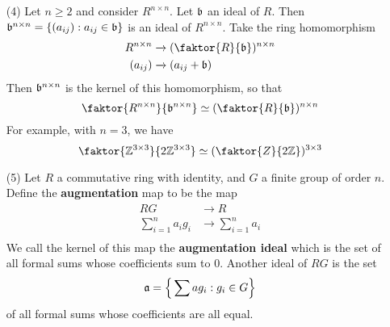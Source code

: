 \begin{example}
\begin{enumerate}
    \item[(4)] Let $n \geq 2$ and consider  $R^{n \times n}$. Let $\bf$ an ideal
      of  $R$. Then  $\bf^{n \times n}=\{(a_{ij}) : a_{ij} \in \bf\}$ is an ideal
      of $R^{n \times n}$. Take the ring homomorphism
      \begin{align*}
        R^{n \times n}  & \xrightarrow{} (\faktor{R}{\bf})^{n \times n}   \\
        (a_{ij})    & \xrightarrow{} (a_{ij}+\bf) \\
      \end{align*}
      Then $\bf^{n \times n}$ is the kernel of this homomorphism, so that
      \begin{equation*}
        \faktor{R^{n \times n}}{\bf^{n \times n}} \simeq (\faktor{R}{\bf})^{n \times n}
      \end{equation*}
      For example, with $n=3$, we have
      \begin{equation*}
        \faktor{\Z^{3 \times 3}}{2\Z^{3 \times 3}} \simeq
        (\faktor{Z}{2\Z})^{3 \times 3}
      \end{equation*}

    \item[(5)] Let $R$ a commutative ring with identity, and  $G$ a finite group
      of order $n$. Define the \textbf{augmentation} map to be the map
      \begin{align*}
        RG      & \xrightarrow{}    R   \\
        \sum_{i=1}^n{a_ig_i}    & \xrightarrow{} \sum_{i=1}^n{a_i}  \\
      \end{align*}
      We call the kernel of this map the \textbf{augmentation ideal} which is
      the set of all formal sums whose coefficients sum to $0$. Another ideal
      of  $RG$ is the set
      \begin{equation*}
        \af= \Big{\{}\sum{ag_i} : g_i \in G \Big{\}}
      \end{equation*}
      of all formal sums whose coefficients are all equal.
  \end{enumerate}
\end{example}

